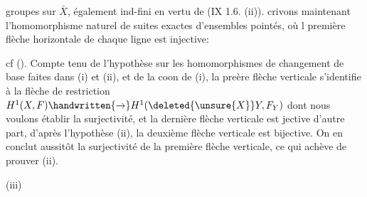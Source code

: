 groupes sur $\bar X$, également ind-fini en vertu de (IX 1.6. (ii)). crivons maintenant l'homomorphisme naturel de suites exactes d'ensembles pointés, où l première flèche horizontale de chaque ligne est injective:


cf (). Compte tenu de l'hypothèse sur les homomorphismes de changement de base faites dans (i) et (ii), et de la coon de (i), la preère flèche verticale s'identifie à la flèche de restriction $H^1(X,F)\handwritten{\to}H^1(\deleted{\unsure{X}}Y,F_Y)$ dont nous voulons établir la surjectivité, et la dernière flèche verticale est jective\handwritten{;} d'autre part, d'après l'hypothèse (ii), la deuxième flèche verticale est bijective. On en conclut aussitôt la  surjectivité de la première flèche verticale, ce qui achève de prouver (ii). 

(iii) 


